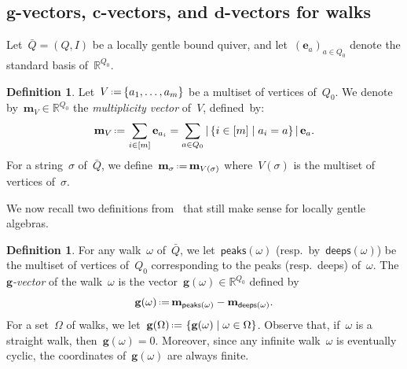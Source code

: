 \documentclass{amsart}
\theoremstyle{definition}
\newtheorem{definition}[theorem]{Definition}
\newtheorem{remark}[theorem]{Remark}
\newcommand{\R}{\mathbb{R}} %
\renewcommand{\b}[1]{\mathbf{#1}} %
\newcommand{\set}[2]{\left\{ #1 \;\middle|\; #2 \right\}} %
\newcommand{\eqdef}{\mbox{\,\raisebox{0.2ex}{\scriptsize\ensuremath{\mathrm:}}\ensuremath{=}\,}} %
\newcommand{\darkblue}{\color{darkblue}} %
\newcommand{\defn}[1]{\textsl{\darkblue #1}} %
\newcommand{\vincent}[1]{\todo[color=blue!30]{#1 \\ \hfill --- V.}}
\newcommand{\peaks}[1]{\mathsf{peaks}(#1)} %
\newcommand{\deeps}[1]{\mathsf{deeps}(#1)} %
\newcommand{\gvector}[1]{\mathbf{g}(#1)} %
\newcommand{\gvectors}[1]{\mathbf{g}(#1)} %
\newcommand{\multiplicityVector}{\b{m}} %
\begin{document}
\subsection{$\b{g}$-vectors, $\b{c}$-vectors, and $\b{d}$-vectors for walks}
\label{subsec:gcdVectorsWalks}

Let~$\bar Q = (Q,I)$ be a locally gentle bound quiver, and let~$(\b{e}_a)_{a \in Q_0}$ denote the standard basis of~$\R^{Q_0}$.

\begin{definition}
Let~$V \eqdef \{a_1, \dots, a_m\}$ be a multiset of vertices of~$Q_0$. We denote by~$\multiplicityVector_V \in \R^{Q_0}$ the \defn{multiplicity vector} of~$V$, defined~by:
\[
\multiplicityVector_V \eqdef \sum_{i \in [m]} \b{e}_{a_i} = \sum_{a \in Q_0} |\set{i \in [m]}{a_i = a}| \, \b{e}_a.
\]
For a string~$\sigma$ of~$\bar Q$, we define~$\multiplicityVector_\sigma \eqdef \multiplicityVector_{V(\sigma)}$ where~$V(\sigma)$ is the multiset of vertices of~$\sigma$. 
\end{definition}

We now recall two definitions from~\cite{PaluPilaudPlamondon} that still make sense for locally gentle algebras.

\begin{definition}
\label{def:gVectorsWalks}
For any walk~$\omega$ of~$\bar Q$, we let~$\peaks{\omega}$ (resp.~by~$\deeps{\omega}$) be the multiset of vertices of~$Q_0$ corresponding to the peaks (resp.~deeps) of~$\omega$.
The \defn{$\b{g}$-vector} of the walk~$\omega$ is the vector~${\gvector{\omega} \in \R^{Q_0}}$ defined by
\[
\gvector{\omega} \eqdef \multiplicityVector_{\peaks{\omega}} - \multiplicityVector_{\deeps{\omega}}.
\]
For a set~$\Omega$ of walks, we let~$\gvectors{\Omega} \eqdef \set{\gvector{\omega}}{\omega \in \Omega}$.
Observe that, if~$\omega$ is a straight walk, then~$\gvector{\omega} = 0$. Moreover, since any infinite walk~$\omega$ is eventually cyclic, the coordinates of~$\gvector{\omega}$ are always finite.
\end{definition}

\end{document}

